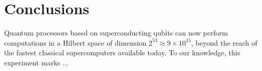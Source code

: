 \section{Conclusions}
\label{sec:conclusions}
Quantum processors based on superconducting qubits can now perform computations
in a Hilbert space of dimension $2^{53} \approx 9 \times 10^{15}$, beyond the
reach of the fastest classical supercomputers available today. To our knowledge,
this experiment marks ... 